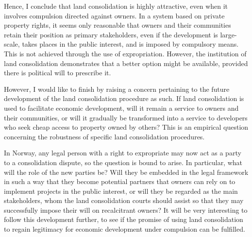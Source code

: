 Hence, I conclude that land consolidation is highly attractive, even when it involves compulsion directed against owners. In a system based on private property rights, it seems only reasonable that owners and their communities retain their position as primary stakeholders, even if the development is large-scale, takes places in the public interest, and is imposed by compulsory means. This is not achieved through the use of expropriation. However, the institution of land consolidation demonstrates that a better option might be available, provided there is political will to prescribe it. 


However, I would like to finish by raising a concern pertaining to the future development of the land consolidation procedure as such. If land consolidation is used to facilitate economic development, will it remain a service to owners and their communities, or will it gradually be transformed into a service to developers who seek cheap access to property owned by others? This is an empirical question concerning the robustness of specific land consolidation procedures. 

In Norway, any legal person with a right to expropriate may now act as a party to a consolidation dispute, so the question is bound to arise. In particular, what will the role of the new parties be? Will they be embedded in the legal framework in such a way that they become potential partners that owners can rely on to implement projects in the public interest, or will they be regarded as the main stakeholders, whom the land consolidation courts should assist so that they may successfully impose their will on recalcitrant owners? It will be very interesting to follow this development further, to see if the promise of using land consolidation to regain legitimacy for economic development under compulsion can be fulfilled.

